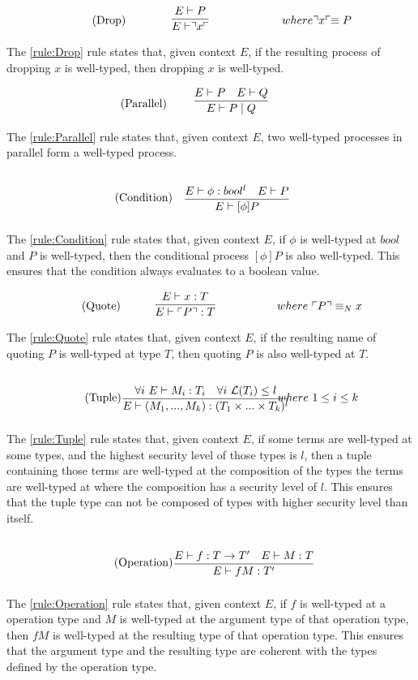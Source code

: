 \begin{align*}
\tag{Drop}\label{rule:Drop} &\infrule{E \vdash P}{E\vdash \drop{x}}& where \drop{x} \equiv P
\end{align*}
The \ref{rule:Drop} rule states that, given context $E$, if the resulting process of dropping $x$ is well-typed, then dropping $x$ is well-typed.

\begin{align*}
\tag{Parallel}\label{rule:Parallel} &\infrule{E\vdash P \quad E \vdash Q}{E \vdash P \para Q}
\end{align*}
The \ref{rule:Parallel} rule states that, given context $E$, two well-typed processes in parallel form a well-typed process.

\begin{align*}
\tag{Condition}\label{rule:Condition} &\infrule{E\vdash \phi:bool^l\quad E\vdash P}{E \vdash [\phi] P}
\end{align*}
The \ref{rule:Condition} rule states that, given context $E$, if $\phi$ is well-typed at $bool$ and $P$ is well-typed, then the conditional process $[\phi]P$ is also well-typed. This ensures that the condition always evaluates to a boolean value.

\begin{align*}
\tag{Quote}\label{rule:Quote} &\infrule{E \vdash x:T}{E\vdash \quot{P}:T}& where\ \quot{P} \equiv_N x
\end{align*}
The \ref{rule:Quote} rule states that, given context $E$, if the resulting name of quoting $P$ is well-typed at type $T$, then quoting $P$ is also well-typed at $T$.

\begin{align*}
\tag{Tuple}\label{rule:Tuple} &\infrule{\forall i\ E\vdash M_i:T_i\quad \forall i\ \level{T_i}\leq l}{E\vdash (M_1,...,M_k):(T_1\times...\times T_k)^l}& where\ 1\leq i\leq k
\end{align*}
The \ref{rule:Tuple} rule states that, given context $E$, if some terms are well-typed at some types, and the highest security level of those types is $l$, then a tuple containing those terms are well-typed at the composition of the types the terms are well-typed at where the composition has a security level of $l$.
This ensures that the tuple type can not be composed of types with higher security level than itself.

\begin{align*}
\tag{Operation}\label{rule:Operation} &\infrule{E\vdash f:T\ra T'\quad E\vdash M:T}{E\vdash fM:T'}
\end{align*}
The \ref{rule:Operation} rule states that, given context $E$, if $f$ is well-typed at a operation type and $M$ is well-typed at the argument type of that operation type, then $fM$ is well-typed at the resulting type of that operation type.
This ensures that the argument type and the resulting type are coherent with the types defined by the operation type.

